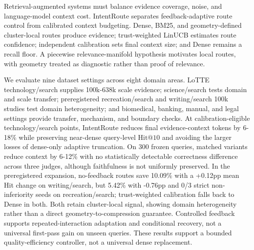 
Retrieval-augmented systems must balance evidence coverage, noise, and language-model context cost. IntentRoute separates feedback-adaptive route control from calibrated context budgeting. Dense, BM25, and geometry-defined cluster-local routes produce evidence; trust-weighted LinUCB estimates route confidence; independent calibration sets final context size; and Dense remains a recall floor. A piecewise relevance-manifold hypothesis motivates local routes, with geometry treated as diagnostic rather than proof of relevance.

We evaluate nine dataset settings across eight domain areas. LoTTE technology/search supplies 100k-638k scale evidence; science/search tests domain and scale transfer; preregistered recreation/search and writing/search 100k studies test domain heterogeneity; and biomedical, banking, manual, and legal settings provide transfer, mechanism, and boundary checks. At calibration-eligible technology/search points, IntentRoute reduces final evidence-context tokens by 6-18\% while preserving near-dense query-level $\mathrm{Hit@10}$ and avoiding the larger losses of dense-only adaptive truncation. On 300 frozen queries, matched variants reduce context by 6-12\% with no statistically detectable correctness difference across three judges, although faithfulness is not uniformly preserved. In the preregistered expansion, no-feedback routes save 10.09\% with a +0.12pp mean Hit change on writing/search, but 5.42\% with -0.76pp and 0/3 strict non-inferiority seeds on recreation/search; trust-weighted calibration falls back to Dense in both. Both retain cluster-local signal, showing domain heterogeneity rather than a direct geometry-to-compression guarantee. Controlled feedback supports repeated-interaction adaptation and conditional recovery, not a universal first-pass gain on unseen queries. These results support a bounded quality-efficiency controller, not a universal dense replacement.
